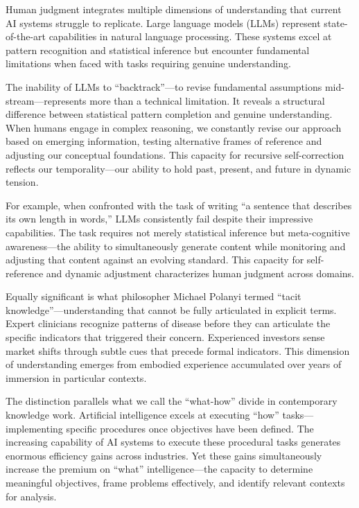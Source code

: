 \documentclass[
  Letterpaper,
]{scrbook}
\begin{document}
Human judgment integrates multiple dimensions of understanding that
current AI systems struggle to replicate. Large language models (LLMs)
represent state-of-the-art capabilities in natural language processing.
These systems excel at pattern recognition and statistical inference but
encounter fundamental limitations when faced with tasks requiring
genuine understanding.

The inability of LLMs to ``backtrack''---to revise fundamental
assumptions mid-stream---represents more than a technical limitation. It
reveals a structural difference between statistical pattern completion
and genuine understanding. When humans engage in complex reasoning, we
constantly revise our approach based on emerging information, testing
alternative frames of reference and adjusting our conceptual
foundations. This capacity for recursive self-correction reflects our
temporality---our ability to hold past, present, and future in dynamic
tension.

For example, when confronted with the task of writing ``a sentence that
describes its own length in words,'' LLMs consistently fail despite
their impressive capabilities. The task requires not merely statistical
inference but meta-cognitive awareness---the ability to simultaneously
generate content while monitoring and adjusting that content against an
evolving standard. This capacity for self-reference and dynamic
adjustment characterizes human judgment across domains.

Equally significant is what philosopher Michael Polanyi termed ``tacit
knowledge''---understanding that cannot be fully articulated in explicit
terms. Expert clinicians recognize patterns of disease before they can
articulate the specific indicators that triggered their concern.
Experienced investors sense market shifts through subtle cues that
precede formal indicators. This dimension of understanding emerges from
embodied experience accumulated over years of immersion in particular
contexts.

The distinction parallels what we call the ``what-how'' divide in
contemporary knowledge work. Artificial intelligence excels at executing
``how'' tasks---implementing specific procedures once objectives have
been defined. The increasing capability of AI systems to execute these
procedural tasks generates enormous efficiency gains across industries.
Yet these gains simultaneously increase the premium on ``what''
intelligence---the capacity to determine meaningful objectives, frame
problems effectively, and identify relevant contexts for analysis.
\end{document}
